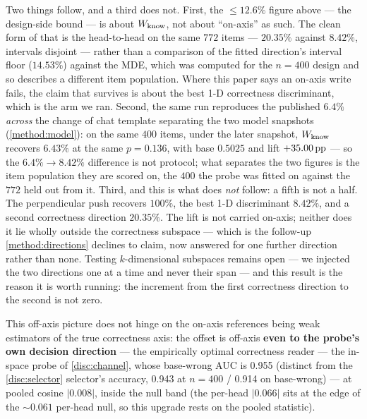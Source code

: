Two things follow, and a third does not. First, the $\leq12.6\%$ figure above --- the
design-side bound --- is about $W_{\mathrm{know}}$, not about ``on-axis'' as such. The clean form of that is the
head-to-head on the same $772$ items --- $20.35\%$ against $8.42\%$, intervals
disjoint --- rather than a comparison of the fitted direction's interval floor
($14.53\%$) against the MDE, which was computed for the $n{=}400$ design and so
describes a different item population. Where this paper says an on-axis
write fails, the claim that survives is about the best 1-D correctness discriminant,
which is the arm we ran. Second, the same run reproduces the published $6.4\%$
\emph{across} the change of chat template separating the two model snapshots
(\cref{method:model}): on the same $400$ items, under the later snapshot, $W_{\mathrm{know}}$
recovers $6.43\%$ at the same $p = 0.136$, with base $0.5025$ and lift $+35.00\,\mathrm{pp}$ ---
so the $6.4\%{\rightarrow}8.42\%$ difference is not protocol; what separates the two
figures is the item population they are scored on, the $400$ the probe was fitted on
against the $772$ held out from it. Third, and
this is what does \emph{not} follow: a fifth is not a half. The perpendicular push
recovers $100\%$, the best 1-D discriminant $8.42\%$, and a second correctness
direction $20.35\%$. The lift is not carried on-axis; neither does it lie wholly
outside the correctness subspace --- which is the follow-up \cref{method:directions}
declines to claim, now answered for one further direction rather than none. Testing
$k$-dimensional subspaces remains open --- we injected the two directions one at a
time and never their span --- and this result is the reason it is worth running: the
increment from the first correctness direction to the second is not zero.

This off-axis picture does not hinge on the on-axis references being weak
estimators of the true correctness axis: the offset is off-axis \textbf{even to the
probe's own decision direction} --- the empirically optimal correctness reader ---
the in-space probe of \cref{disc:channel}, whose base-wrong AUC is 0.955 (distinct
from the \cref{disc:selector} selector's accuracy, 0.943 at $n{=}400$ / 0.914 on
base-wrong) --- at pooled cosine $|0.008|$, inside the null band (the per-head
$|0.066|$ sits at the edge of the ${\sim}0.061$ per-head null, so this upgrade
rests on the pooled statistic).

